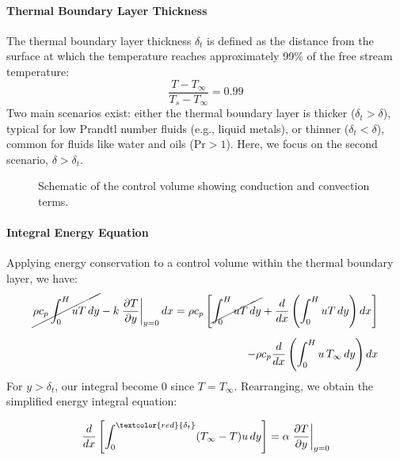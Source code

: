 \paragraph{Thermal Boundary Layer Thickness}
The thermal boundary layer thickness \(\delta_t\) is defined as the distance from the surface at which the temperature reaches approximately 99\% of the free stream temperature:
\[
    \frac{T - T_\infty}{T_s - T_\infty} = 0.99
\]
%
Two main scenarios exist: either the thermal boundary layer is thicker (\(\delta_t > \delta\)), typical for low Prandtl number fluids (e.g., liquid metals), or thinner (\(\delta_t < \delta\)), common for fluids like water and oils (\(\mathrm{Pr} > 1\)). Here, we focus on the second scenario, \(\delta > \delta_t\).
%
\begin{figure}[H]
\centering
{}
\caption{Schematic of the control volume showing conduction and convection terms.}
\end{figure}
\paragraph{Integral Energy Equation}
Applying energy conservation to a control volume within the thermal boundary layer, we have:
%
\[
    \begin{aligned}
        \cancel{\rho c_p \int_0^H u T \,dy} - k\left.\frac{\partial T}{\partial y}\right|_{y=0}dx = \rho c_p\left[\cancel{\int_0^H u T \,dy} + \frac{d}{dx}\left(\int_0^H u T \,dy\right)dx\right]
        \\[0.5em]
        - \rho c_p  \frac{d}{dx}\left(\int_0^H u\, T_\infty\,dy\right)dx        
    \end{aligned}
\]
%
For $y>\delta_t$, our integral become 0 since $T=T_\infty$. Rearranging, we obtain the simplified energy integral equation:
\begin{definition}
\[
    \frac{d}{dx}\left[\int_0^{\textcolor{red}{\delta_t}} (T_\infty - T) u \,dy\right] = \alpha \left.\frac{\partial T}{\partial y}\right|_{y=0}
\]
\end{definition}
%
